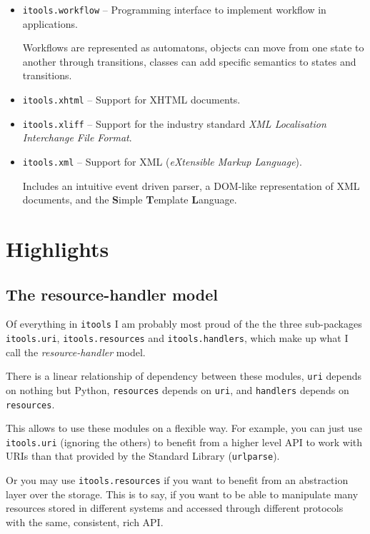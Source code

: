 \begin{itemize}
  \item {\tt itools.workflow} -- Programming interface to implement workflow
    in applications.

    Workflows are represented as automatons, objects can move from one state
    to another through transitions, classes can add specific semantics to
    states and transitions.

  \item {\tt itools.xhtml} -- Support for XHTML documents.

  \item {\tt itools.xliff} -- Support for the industry standard {\em XML
    Localisation Interchange File Format}.

  \item {\tt itools.xml} -- Support for XML ({\em eXtensible Markup Language}).

    Includes an intuitive event driven parser, a DOM-like representation of
    XML documents, and the {\bf S}imple {\bf T}emplate {\bf L}anguage.

\end{itemize}


\section{Highlights}

\subsection{The resource-handler model}

Of everything in {\tt itools} I am probably most proud of the the three
sub-packages {\tt itools.uri}, {\tt itools.resources} and
{\tt itools.handlers}, which make up what I call the {\em resource-handler}
model.

There is a linear relationship of dependency between these modules, {\tt uri}
depends on nothing but Python, {\tt resources} depends on {\tt uri}, and
{\tt handlers} depends on {\tt resources}.

This allows to use these modules on a flexible way. For example, you can
just use {\tt itools.uri} (ignoring the others) to benefit from a higher
level API to work with URIs than that provided by the Standard Library
({\tt urlparse}).

Or you may use {\tt itools.resources} if you want to benefit from an
abstraction layer over the storage. This is to say, if you want to be able
to manipulate many resources stored in different systems and accessed
through different protocols with the same, consistent, rich API.

